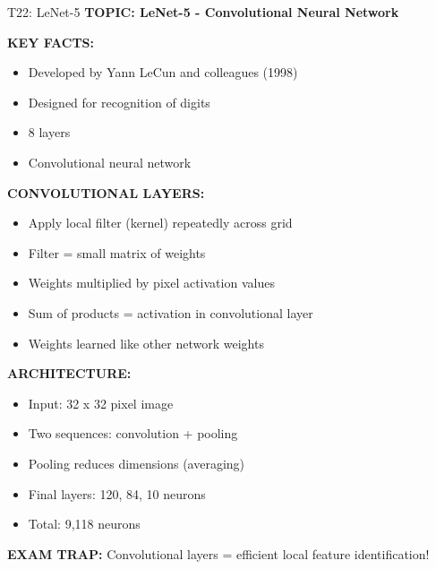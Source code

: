 \documentclass[8pt]{beamer}
\begin{document}
	\begin{frame}{T22: LeNet-5}
		\fontsize{6.5}{7.5}\selectfont
		\textbf{TOPIC: LeNet-5 - Convolutional Neural Network}
		
		\vspace{0.1cm}
		\textbf{KEY FACTS:}
		\begin{itemize}
			\item Developed by Yann LeCun and colleagues (1998)
			\item Designed for recognition of digits
			\item 8 layers
			\item Convolutional neural network
		\end{itemize}
		
		\vspace{0.1cm}
		\textbf{CONVOLUTIONAL LAYERS:}
		\begin{itemize}
			\item Apply local filter (kernel) repeatedly across grid
			\item Filter = small matrix of weights
			\item Weights multiplied by pixel activation values
			\item Sum of products = activation in convolutional layer
			\item Weights learned like other network weights
		\end{itemize}
		
		\vspace{0.1cm}
		\textbf{ARCHITECTURE:}
		\begin{itemize}
			\item Input: 32 x 32 pixel image
			\item Two sequences: convolution + pooling
			\item Pooling reduces dimensions (averaging)
			\item Final layers: 120, 84, 10 neurons
			\item Total: 9,118 neurons
		\end{itemize}
		
		\textcolor{myred}{\textbf{EXAM TRAP:}} Convolutional layers = \textcolor{myblue}{efficient local feature identification}!
	\end{frame}
	
\end{document}
